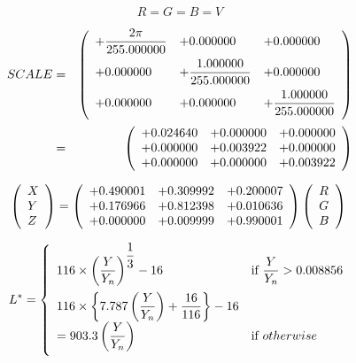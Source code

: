 \documentclass{article}
\begin{document}
\[ R = G = B = V \]
\pagebreak

\begin{eqnarray*} SCALE &=& \left( \begin{array}{lll} +\dfrac{2\pi}{255.000000} & +0.000000 & +0.000000 \vspace{.5em} \\ +0.000000 & +\dfrac{1.000000}{255.000000} & +0.000000 \vspace{.5em} \\ +0.000000 & +0.000000 & +\dfrac{1.000000}{255.000000} \vspace{.5em} \\ \end{array} \right) \\ &=& \left( \begin{array}{lll} +0.024640 & +0.000000 & +0.000000 \\ +0.000000 & +0.003922 & +0.000000 \\ +0.000000 & +0.000000 & +0.003922 \\ \end{array} \right) \end{eqnarray*}
\pagebreak

\[ \left( \begin{array}{l} X \\ Y \\ Z \\ \end{array} \right) = \left( \begin{array}{lll} +0.490001 & +0.309992 & +0.200007 \\ +0.176966 & +0.812398 & +0.010636 \\ +0.000000 & +0.009999 & +0.990001 \\ \end{array} \right) \left( \begin{array}{l} R \\ G \\ B \\ \end{array} \right)\\ \]
\pagebreak

\[ L^*=\left \{ \begin{array}{ll} 116\times \left(\dfrac{Y}{Y_{n}}\right)^{\dfrac{1}{3}} - 16 & \mbox{if}\ \dfrac{Y}{Y_{n}} > 0.008856 \vspace{.5em} \\ 116\times \left\{7.787\left(\dfrac{Y}{Y_{n}}\right) + \dfrac{16}{116}\right\} - 16\\ = 903.3\left(\dfrac{Y}{Y_{n}}\right) & \mbox{if}\ otherwise \vspace{.5em} \\ \end{array} \right. \]
\pagebreak
\end{document}

